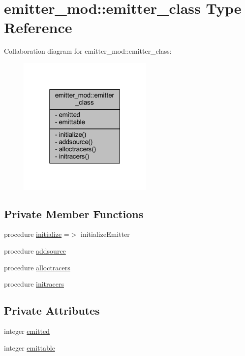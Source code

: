 \hypertarget{structemitter__mod_1_1emitter__class}{}\section{emitter\+\_\+mod\+:\+:emitter\+\_\+class Type Reference}
\label{structemitter__mod_1_1emitter__class}


Collaboration diagram for emitter\+\_\+mod\+:\+:emitter\+\_\+class\+:\nopagebreak
\begin{figure}[H]
\begin{center}
\leavevmode
\includegraphics[width=187pt]{structemitter__mod_1_1emitter__class__coll__graph}
\end{center}
\end{figure}
\subsection*{Private Member Functions}
\begin{DoxyCompactItemize}
\item 
procedure \mbox{\hyperlink{structemitter__mod_1_1emitter__class_acd215b2680677e298267c5940f0cf79b}{initialize}} =$>$ initialize\+Emitter
\item 
procedure \mbox{\hyperlink{structemitter__mod_1_1emitter__class_a162685b7b0bf96b555fee37e129c9783}{addsource}}
\item 
procedure \mbox{\hyperlink{structemitter__mod_1_1emitter__class_a2e8c9f860c170e5ca3c33e801471c387}{alloctracers}}
\item 
procedure \mbox{\hyperlink{structemitter__mod_1_1emitter__class_a53842af46b11fe923f582487eb26195d}{initracers}}
\end{DoxyCompactItemize}
\subsection*{Private Attributes}
\begin{DoxyCompactItemize}
\item 
integer \mbox{\hyperlink{structemitter__mod_1_1emitter__class_aa8f56d34f32e452a2e78f93f44780b4b}{emitted}}
\item 
integer \mbox{\hyperlink{structemitter__mod_1_1emitter__class_a201a8b070193b7217c5a5c8973d76cd6}{emittable}}
\end{DoxyCompactItemize}


